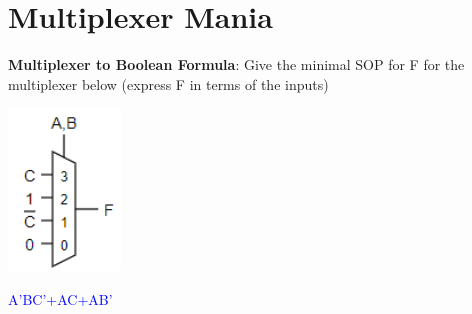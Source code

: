 \documentclass{article}
\begin{document}
\section{Multiplexer Mania}
    \textbf{Multiplexer to Boolean Formula}: Give the minimal SOP for F for the multiplexer below (express F in terms of the inputs)
    \newline
    \begin{multicols}{2}
    \begin{center}
    \includegraphics[width=3cm]{figures/Multiplexer.png}
    \end{center}
    \columnbreak
    \textcolor{blue}{A’BC’+AC+AB’}
    \end{multicols}
\end{document}
